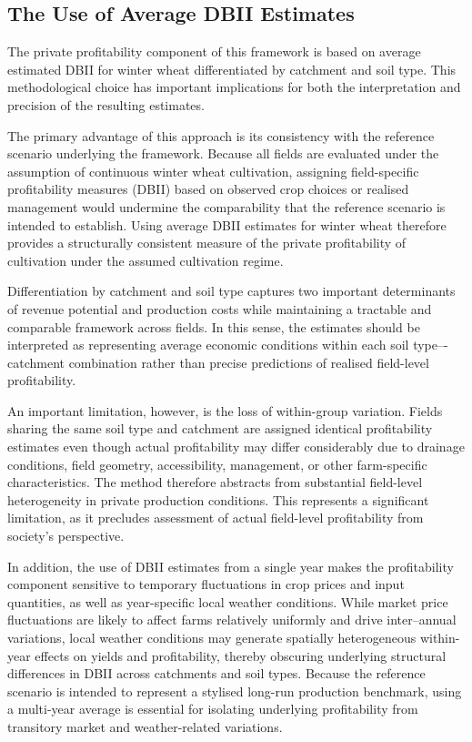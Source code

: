 \documentclass[12pt]{article}
\begin{document}
\subsection{The Use of Average DBII Estimates}

\label{The Use of Average DBII Estimates}
The private profitability component of this framework is based on average estimated DBII for winter wheat differentiated by catchment and soil type. 
This methodological choice has important implications for both the interpretation and precision of the resulting estimates.

The primary advantage of this approach is its consistency with the reference scenario underlying the framework. 
Because all fields are evaluated under the assumption of continuous winter wheat cultivation, assigning field-specific profitability measures (DBII) based on observed crop choices or realised management would undermine the comparability that the reference scenario is intended to establish.
Using average DBII estimates for winter wheat therefore provides a structurally consistent measure of the private profitability of cultivation under the assumed cultivation regime.

Differentiation by catchment and soil type captures two important determinants of revenue potential and production costs while maintaining a tractable and comparable framework across fields. 
In this sense, the estimates should be interpreted as representing average economic conditions within each soil type–-catchment combination rather than precise predictions of realised field-level profitability.

An important limitation, however, is the loss of within-group variation. 
Fields sharing the same soil type and catchment are assigned identical profitability estimates even though actual profitability may differ considerably due to drainage conditions, field geometry, accessibility, management, or other farm-specific characteristics. 
The method therefore abstracts from substantial field-level heterogeneity in private production conditions. 
This represents a significant limitation, as it precludes assessment of actual field-level profitability from society's perspective.

In addition, the use of DBII estimates from a single year makes the profitability component sensitive to temporary fluctuations in crop prices and input quantities, as well as year-specific local weather conditions. 
While market price fluctuations are likely to affect farms relatively uniformly and drive inter--annual variations, local weather conditions may generate spatially heterogeneous within-year effects on yields and profitability, thereby obscuring underlying structural differences in DBII across catchments and soil types. 
Because the reference scenario is intended to represent a stylised long-run production benchmark, using a multi-year average is essential for isolating underlying profitability from transitory market and weather-related variations.
\end{document}
